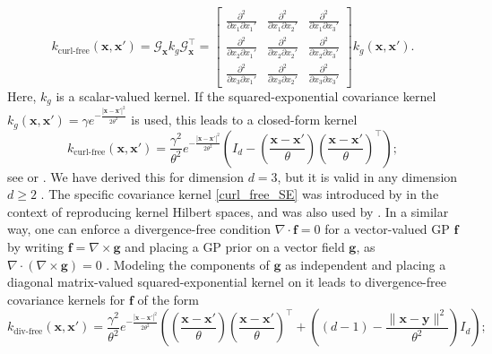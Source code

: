 \begin{equation}
k_{\text{curl-free}}(\mathbf{x},\mathbf{x}') = 
\mathcal{G}_{\mathbf{x}}  k_g \mathcal{G}_{\mathbf{x}}^\top 
= 
\begin{bmatrix*}
\frac{\partial^2 }{\partial x_1 \partial x_1'}
&
\frac{\partial^2 }{\partial x_1 \partial x_2'}
&
\frac{\partial^2 }{\partial x_1 \partial x_3'}
\\[6pt]
\frac{\partial^2 }{\partial x_2 \partial x_1'}
&
\frac{\partial^2 }{\partial x_2 \partial x_2'}
&
\frac{\partial^2 }{\partial x_2 \partial x_3'}
\\[6pt]
\frac{\partial^2 }{\partial x_3 \partial x_1'}
&
\frac{\partial^2 }{\partial x_3 \partial x_2'}
&
\frac{\partial^2 }{\partial x_3 \partial x_3'}
\end{bmatrix*}
k_g (\mathbf{x}, \mathbf{x}').
\end{equation}
Here, $k_g$ is a scalar-valued kernel. 
If the squared-exponential covariance kernel 
$k_g(\mathbf{x},\mathbf{x}') = \gamma e^{-\frac{|\mathbf{x} - \mathbf{x}'|^2}{2\theta^2}}$ is used, this leads to a closed-form kernel
\begin{equation}\label{curl_free_SE}
k_{\text{curl-free}}(\mathbf{x},\mathbf{x}') = 
\frac{\gamma^2}{\theta^2} 
e^{-\frac{|\mathbf{x} - \mathbf{x}'|^2}{2\theta^2}}
\left(
I_d - 
\left( \frac{\mathbf{x} - \mathbf{x}'}{\theta} \right)
\left( \frac{\mathbf{x} - \mathbf{x}'}{\theta} \right)^\top
\right); 
\end{equation}
see  or . We have derived this for dimension $d = 3$, but it is valid in any dimension $d \ge 2$ . The specific covariance kernel \eqref{curl_free_SE} was introduced by  in the context of reproducing kernel Hilbert spaces, and was also used by . 
In a similar way, one can enforce a divergence-free condition $\nabla \cdot \mathbf{f} = 0$ for a vector-valued GP $\mathbf{f}$ by writing $\mathbf{f} = \nabla \times \mathbf{g}$ and placing a GP prior on a vector field $\mathbf{g}$, as $\nabla \cdot (\nabla \times \mathbf{g}) = 0$ .
Modeling the components of $\mathbf{g}$ as independent and placing a diagonal matrix-valued squared-exponential kernel on it leads to divergence-free covariance kernels for $\mathbf{f}$ of the form
\begin{equation}\label{div_free_SE}
k_{\text{div-free}}(\mathbf{x},\mathbf{x}') = 
\frac{\gamma^2}{\theta^2} 
e^{-\frac{|\mathbf{x} - \mathbf{x}'|^2}{2\theta^2}}
\left(
\left( \frac{\mathbf{x} - \mathbf{x}'}{\theta} \right)
\left( \frac{\mathbf{x} - \mathbf{x}'}{\theta} \right)^\top
+
\left(
(d-1) - \frac{\| \mathbf{x} - \mathbf{y} \|^2}{\theta^2}
\right) I_d
\right); 
\end{equation}
